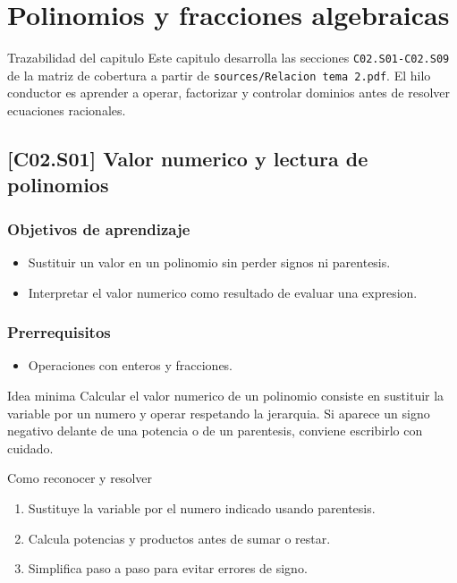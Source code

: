 \chapter{Polinomios y fracciones algebraicas}

\begin{theorybox}{Trazabilidad del capitulo}
Este capitulo desarrolla las secciones \texttt{C02.S01-C02.S09} de la matriz de cobertura a
partir de \texttt{sources/Relacion tema 2.pdf}. El hilo conductor es aprender a operar,
factorizar y controlar dominios antes de resolver ecuaciones racionales.
\end{theorybox}

\section{[C02.S01] Valor numerico y lectura de polinomios}

\subsection*{Objetivos de aprendizaje}
\begin{itemize}
  \item Sustituir un valor en un polinomio sin perder signos ni parentesis.
  \item Interpretar el valor numerico como resultado de evaluar una expresion.
\end{itemize}

\subsection*{Prerrequisitos}
\begin{itemize}
  \item Operaciones con enteros y fracciones.
\end{itemize}

\begin{theorybox}{Idea minima}
Calcular el valor numerico de un polinomio consiste en sustituir la variable por un numero y
operar respetando la jerarquia. Si aparece un signo negativo delante de una potencia o de un
parentesis, conviene escribirlo con cuidado.
\end{theorybox}

\begin{methodbox}{Como reconocer y resolver}
\begin{enumerate}
  \item Sustituye la variable por el numero indicado usando parentesis.
  \item Calcula potencias y productos antes de sumar o restar.
  \item Simplifica paso a paso para evitar errores de signo.
\end{enumerate}
\end{methodbox}

